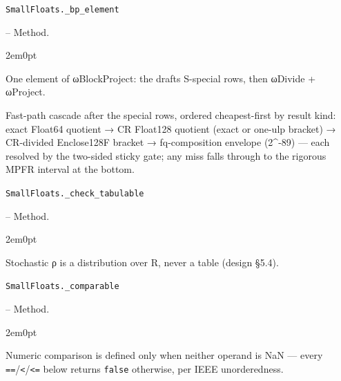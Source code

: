 \par\medskip\noindent\begin{minipage}{\linewidth}
\hypertarget{15942066643973002529}{\texttt{SmallFloats.\_\allowbreak{}bp\_\allowbreak{}element}}  -- {Method.}
\nopagebreak
\begin{adjustwidth}{2em}{0pt}

One element of ωBlockProject: the draft{\textquotesingle}s S-special rows, then ωDivide + ωProject.

Fast-path cascade after the special rows, ordered cheapest-first by result kind: exact Float64 quotient → CR Float128 quotient (exact or one-ulp bracket) → CR-divided Enclose128F bracket → fq-composition envelope (2{\textasciicircum}-89) — each resolved by the two-sided sticky gate; any miss falls through to the rigorous MPFR interval at the bottom.



\end{adjustwidth}
\end{minipage}
\par\medskip

\par\medskip\noindent\begin{minipage}{\linewidth}
\hypertarget{4327771365995947438}{\texttt{SmallFloats.\_\allowbreak{}check\_\allowbreak{}tabulable}}  -- {Method.}
\nopagebreak
\begin{adjustwidth}{2em}{0pt}

Stochastic ρ is a distribution over R, never a table (design §5.4).



\end{adjustwidth}
\end{minipage}
\par\medskip

\par\medskip\noindent\begin{minipage}{\linewidth}
\hypertarget{11960956699752345863}{\texttt{SmallFloats.\_\allowbreak{}comparable}}  -- {Method.}
\nopagebreak
\begin{adjustwidth}{2em}{0pt}

Numeric comparison is defined only when neither operand is NaN — every \texttt{==}/\allowbreak\texttt{<}/\texttt{<=} below returns \texttt{false} otherwise, per IEEE unorderedness.



\end{adjustwidth}
\end{minipage}
\par\medskip

